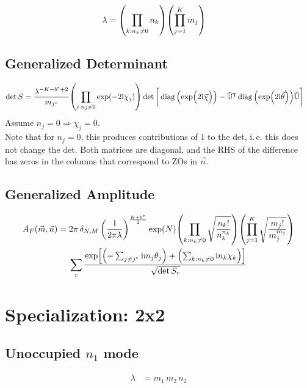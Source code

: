 \documentclass[
	english,
	a4paper,
	fontsize=10pt,
	parskip=half,
	titlepage=true,
	DIV=12,
	final
]{scrreprt}
\newcommand*{\ie}{i.\,e.\xspace}
\newcommand*{\Thus}{\ensuremath{\Rightarrow}\xspace}
\newcommand*{\transp}{\ensuremath{^\intercal}}
\newcommand*{\iunit}{\ensuremath{\mathrm{i}}}
\DeclareMathOperator{\diag}{diag}
\begin{document}
\begin{align}
	\lambda
&=
	\qty( \prod_{k : n_k \neq 0} n_k )
	\qty( \prod_{j = 1}^{K}      m_j )
\label{eqn:DefLambdaNonBZO_n}
\end{align}

\subsection{Generalized Determinant}
\begin{align}
	\det S
&=
	\frac{ \lambda^{-K - b^* + 2} }{ m_{j^*} }
	\qty( \prod_{j: n_j \neq 0} \exp(-2\iunit \chi_j) )
	\det\qty[\bigg.
		\diag\qty(\exp(\Big.2\iunit\vec{\chi}))
		-
		\tilde{\mathbb{U}}\transp
		\diag\qty(\exp(2\iunit\vec{\theta}))
		\tilde{\mathbb{U}}
	]
\label{eqn:detSNonBZO_n}
\end{align}
Assume $n_j = 0 \Thus \chi_j = 0$.\\

Note that for $n_j = 0$, this produces contributions of $1$ to the det, \ie this does not change the det. Both matrices are diagonal, and the RHS of the difference has zeros in the columns that correspond to ZOs in $\vec{n}$.

\subsection{Generalized Amplitude}
\begin{multline}
	A_F(\vec{m}, \vec{n})
=
	2\pi \, \delta_{N,M} \, \qty(
		\frac{1}{2\pi\lambda}
	)^{\frac{K + b^*}{2}}
	\exp(N)
	\qty( \prod_{k : n_k \neq 0}
		\sqrt{\frac
			{ n_k! }
			{ n_k^{n_k} }
	})
	\qty( \prod_{j = 1}^{K}
		\sqrt{\frac
			{ m_j! }
			{ m_j^{m_j} }
	})
\\
	\sum_r
		\frac
		{\exp[
			\qty(- \sum_{j\neq j^*}      \iunit m_j \theta_j) + 
			\qty(  \sum_{k : n_k \neq 0} \iunit n_k \chi  _k)
		]}
		{\sqrt{\det S_r}}
\end{multline}

\section{Specialization: 2x2}
\subsection{Unoccupied $n_1$ mode}
\begin{align}
	\lambda
&=
	m_1 \, m_2 \, n_2
\end{align}
\end{document}
